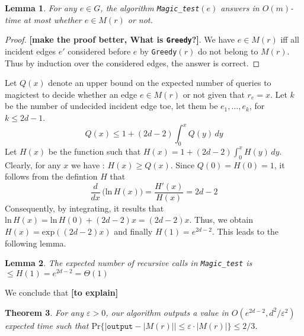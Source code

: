 \documentclass{jams-l}
\newtheorem{theorem}{Theorem}[section]
\newtheorem{lemma}[theorem]{Lemma}
\theoremstyle{definition}
\theoremstyle{remark}
\numberwithin{equation}{section}
\begin{document}
\begin{lemma}
For any $e \in G$, the algorithm \texttt{Magic\_test}$(e)$ answers in $O(m)$-time at most whether $e \in M(r)$ or not.
\end{lemma}
\begin{proof}
\textbf{[make the proof better, What is \texttt{Greedy}?]}. We have $e \in M(r)$ iff all incident edges $e'$ considered before $e$ by \texttt{Greedy}$(r)$ do not belong to $M(r)$. Thus by induction over the considered edges, the answer is correct.
\end{proof}

Let $Q(x)$ denote an upper bound on the expected number of queries to magictest to decide whether an edge $e \in M(r)$ or not given that $r_e = x$. Let $k$ be the number of undecided incident edge toe, let them be $e_1,\dots,e_k$, for $k \leq 2d-1$.
\[
Q(x) \leq 1 + (2d-2) \int_0^x Q(y)\,dy
\]
Let $H(x)$ be the function such that $H(x) = 1 +(2d-2) \int_0^x H(y)\,dy$. Clearly, for any $x$ we have : $H(x) \geq Q(x)$. Since $Q(0) = H(0) = 1$, it follows from the defintion $H$  that
\[
\frac{d}{dx}\,\Big(\mathrm{ln}\,H(x)\Big) = \frac{H'(x)}{H(x)} = 2d-2
\]
Consequently, by integrating, it results that $\mathrm{ln}\,H(x) = \mathrm{ln}\,H(0)+ (2d-2)x = (2d-2)x$. Thus, we obtain $H(x) = \mathrm{exp}((2d-2)x)$ and finally $H(1) = e^{2d-2}$. This leads to the following lemma.

\begin{lemma}
The expected number of recursive calls in \texttt{Magic\_test} is $\leq H(1) = e^{2d-2} = \Theta(1)$
\end{lemma}

We conclude that \textbf{[to explain]}

\begin{theorem}
For any $\varepsilon >0$, our algorithm outputs a value in $O(e^{2d-2},d^2/\varepsilon^2)$ expected time such that $\mathrm{Pr}\{ |\texttt{output} - |M(r)|| \leq \varepsilon \cdot |M(r)|\} \leq 2/3$.
\end{theorem}




\end{document}
